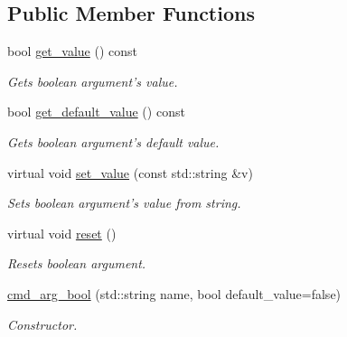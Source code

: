 \subsection*{Public Member Functions}
\begin{DoxyCompactItemize}
\item 
\hypertarget{classcmd__arg__bool_a89c039485a3d0a7266c18ae1f414a7ff}{bool \hyperlink{classcmd__arg__bool_a89c039485a3d0a7266c18ae1f414a7ff}{get\-\_\-value} () const }\label{classcmd__arg__bool_a89c039485a3d0a7266c18ae1f414a7ff}

\begin{DoxyCompactList}\small\item\em Gets boolean argument's value. \end{DoxyCompactList}\item 
\hypertarget{classcmd__arg__bool_ad863fec9da3b99ea24b2919bd0c30086}{bool \hyperlink{classcmd__arg__bool_ad863fec9da3b99ea24b2919bd0c30086}{get\-\_\-default\-\_\-value} () const }\label{classcmd__arg__bool_ad863fec9da3b99ea24b2919bd0c30086}

\begin{DoxyCompactList}\small\item\em Gets boolean argument's default value. \end{DoxyCompactList}\item 
\hypertarget{classcmd__arg__bool_a588134657e85b4ce161f5030f354f00d}{virtual void \hyperlink{classcmd__arg__bool_a588134657e85b4ce161f5030f354f00d}{set\-\_\-value} (const std\-::string \&v)}\label{classcmd__arg__bool_a588134657e85b4ce161f5030f354f00d}

\begin{DoxyCompactList}\small\item\em Sets boolean argument's value from string. \end{DoxyCompactList}\item 
\hypertarget{classcmd__arg__bool_a0e0d273f34d39aad1c1f5d3113d1568f}{virtual void \hyperlink{classcmd__arg__bool_a0e0d273f34d39aad1c1f5d3113d1568f}{reset} ()}\label{classcmd__arg__bool_a0e0d273f34d39aad1c1f5d3113d1568f}

\begin{DoxyCompactList}\small\item\em Resets boolean argument. \end{DoxyCompactList}\item 
\hyperlink{classcmd__arg__bool_a509c088d601e1e3c413801211d4e481e}{cmd\-\_\-arg\-\_\-bool} (std\-::string name, bool default\-\_\-value=false)
\begin{DoxyCompactList}\small\item\em Constructor. \end{DoxyCompactList}\end{DoxyCompactItemize}


